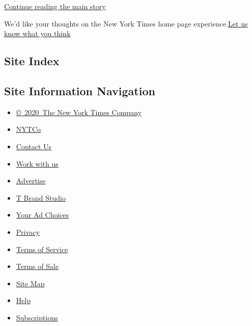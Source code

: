 \protect\hyperlink{after-dfp-ad-mid1-large}{Continue reading the main
story}

We'd like your thoughts on the New York Times home page
experience.\href{http://nyt.qualtrics.com/jfe/form/SV_eFJmKj9v0krSE0l}{Let
us know what you think}

\hypertarget{site-index}{%
\subsection{Site Index}\label{site-index}}

\hypertarget{site-information-navigation}{%
\subsection{Site Information
Navigation}\label{site-information-navigation}}

\begin{itemize}
\tightlist
\item
  \href{https://help.nytimes3xbfgragh.onion/hc/en-us/articles/115014792127-Copyright-notice}{©~2020~The
  New York Times Company}
\end{itemize}

\begin{itemize}
\tightlist
\item
  \href{https://www.nytco.com/}{NYTCo}
\item
  \href{https://help.nytimes3xbfgragh.onion/hc/en-us/articles/115015385887-Contact-Us}{Contact
  Us}
\item
  \href{https://www.nytco.com/careers/}{Work with us}
\item
  \href{https://nytmediakit.com/}{Advertise}
\item
  \href{http://www.tbrandstudio.com/}{T Brand Studio}
\item
  \href{https://www.nytimes3xbfgragh.onion/privacy/cookie-policy\#how-do-i-manage-trackers}{Your
  Ad Choices}
\item
  \href{https://www.nytimes3xbfgragh.onion/privacy}{Privacy}
\item
  \href{https://help.nytimes3xbfgragh.onion/hc/en-us/articles/115014893428-Terms-of-service}{Terms
  of Service}
\item
  \href{https://help.nytimes3xbfgragh.onion/hc/en-us/articles/115014893968-Terms-of-sale}{Terms
  of Sale}
\item
  \href{https://spiderbites.nytimes3xbfgragh.onion}{Site Map}
\item
  \href{https://help.nytimes3xbfgragh.onion/hc/en-us}{Help}
\item
  \href{https://www.nytimes3xbfgragh.onion/subscription?campaignId=37WXW}{Subscriptions}
\end{itemize}
